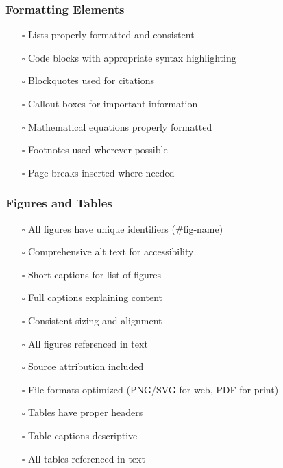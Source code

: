 \documentclass[
  11pt,
  letterpaper,
]{book}
\providecommand{\tightlist}{%
  \setlength{\itemsep}{0pt}\setlength{\parskip}{0pt}}
\begin{document}
\subsubsection*{Formatting Elements}\label{formatting-elements}

\begin{itemize}
\tightlist
\item[$\square$]
  Lists properly formatted and consistent
\item[$\square$]
  Code blocks with appropriate syntax highlighting
\item[$\square$]
  Blockquotes used for citations
\item[$\square$]
  Callout boxes for important information
\item[$\square$]
  Mathematical equations properly formatted
\item[$\square$]
  Footnotes used wherever possible
\item[$\square$]
  Page breaks inserted where needed
\end{itemize}

\subsubsection*{Figures and Tables}\label{figures-and-tables}

\begin{itemize}
\tightlist
\item[$\square$]
  All figures have unique identifiers (\#fig-name)
\item[$\square$]
  Comprehensive alt text for accessibility
\item[$\square$]
  Short captions for list of figures
\item[$\square$]
  Full captions explaining content
\item[$\square$]
  Consistent sizing and alignment
\item[$\square$]
  All figures referenced in text
\item[$\square$]
  Source attribution included
\item[$\square$]
  File formats optimized (PNG/SVG for web, PDF for print)
\item[$\square$]
  Tables have proper headers
\item[$\square$]
  Table captions descriptive
\item[$\square$]
  All tables referenced in text
\end{itemize}
\end{document}
